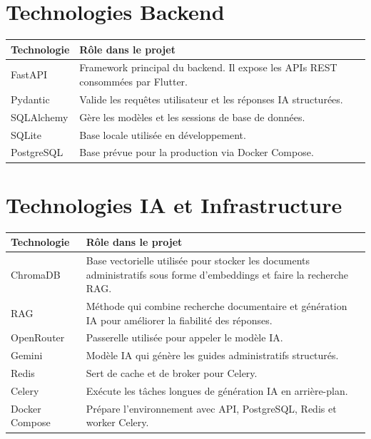 \documentclass[12pt,a4paper]{report}
\begin{document}
\section{Technologies Backend}

\begin{longtable}{|p{4cm}|p{10cm}|}
\hline
\textbf{Technologie} & \textbf{Rôle dans le projet} \\
\hline
\endhead
FastAPI & Framework principal du backend. Il expose les APIs REST consommées par Flutter. \\
\hline
Pydantic & Valide les requêtes utilisateur et les réponses IA structurées. \\
\hline
SQLAlchemy & Gère les modèles et les sessions de base de données. \\
\hline
SQLite & Base locale utilisée en développement. \\
\hline
PostgreSQL & Base prévue pour la production via Docker Compose. \\
\hline
\end{longtable}

\section{Technologies IA et Infrastructure}

\begin{longtable}{|p{4cm}|p{10cm}|}
\hline
\textbf{Technologie} & \textbf{Rôle dans le projet} \\
\hline
\endhead
ChromaDB & Base vectorielle utilisée pour stocker les documents administratifs sous forme d'embeddings et faire la recherche RAG. \\
\hline
RAG & Méthode qui combine recherche documentaire et génération IA pour améliorer la fiabilité des réponses. \\
\hline
OpenRouter & Passerelle utilisée pour appeler le modèle IA. \\
\hline
Gemini & Modèle IA qui génère les guides administratifs structurés. \\
\hline
Redis & Sert de cache et de broker pour Celery. \\
\hline
Celery & Exécute les tâches longues de génération IA en arrière-plan. \\
\hline
Docker Compose & Prépare l'environnement avec API, PostgreSQL, Redis et worker Celery. \\
\hline
\end{longtable}

\end{document}
